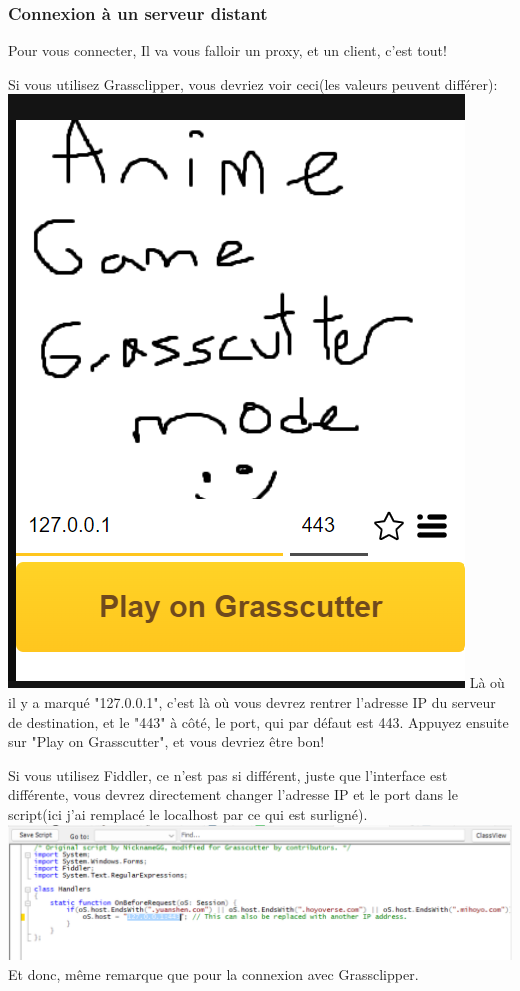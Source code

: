 \documentclass{article}
\begin{document}
\subsubsection{Connexion à un serveur distant}
Pour vous connecter, Il va vous falloir un proxy, et un client, c'est tout!\newline\newline

Si vous utilisez Grassclipper, vous devriez voir ceci(les valeurs peuvent différer):\newline
\includegraphics[scale=0.8]{img/grassclipper_co.png}\newline
Là où il y a marqué "127.0.0.1", c'est là où vous devrez rentrer l'adresse IP du serveur de destination, et le "443" à côté, le port, qui par défaut est 443.\newline
Appuyez ensuite sur "Play on Grasscutter", et vous devriez être bon!\newline\newline

Si vous utilisez Fiddler, ce n'est pas si différent, juste que l'interface est différente, vous devrez directement changer l'adresse IP et le port dans le script(ici j'ai remplacé le localhost par ce qui est surligné).\newline
\includegraphics[scale=0.6]{img/fiddler_co.png}\newline
Et donc, même remarque que pour la connexion avec Grassclipper.
\end{document}

